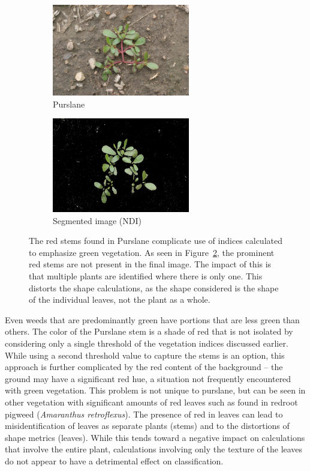 \documentclass[letterpaper]{report}
\begin{document}
\begin{figure}[h!]
	\centering
	\begin{subfigure}[h]{.40\textwidth}
		\centering
		\includegraphics[width=6cm]{./figures/purslane.png}
		\caption{Purslane}
		\label{fig:purslane}
	\end{subfigure}
	\begin{subfigure}[h]{.40\textwidth}
		\centering
		\includegraphics[width=6cm]{./figures/purslane-segmented.jpg}
		\caption{Segmented image (NDI)}
		\label{fig:purslane-segmented}
	\end{subfigure}
	\caption[Color problems complicate segmentation]{The red stems found in Purslane complicate use of indices calculated to emphasize green vegetation. As seen in Figure~\ref{fig:purslane-segmented}, the prominent red stems are not present in the final image. The impact of this is that multiple plants are identified where there is only one. This distorts the shape calculations, as the shape considered is the shape of the individual leaves, not the plant as a whole.}
	\label{fig:segmentation-problem}
\end{figure}

Even weeds that are predominantly green have portions that are less green than others. The color of the Purslane stem is a shade of red that is not isolated by considering only a single threshold of the vegetation indices discussed earlier. While using a second threshold value to capture the stems is an option, this approach is further complicated by the red content of the background -- the ground may have a significant red hue, a situation not frequently encountered with green vegetation. This problem is not unique to purslane, but can be seen in other vegetation with significant amounts of red leaves such as found in redroot pigweed (\textit{Amaranthus retroflexus}).  The presence of red in leaves can lead to misidentification of leaves as separate plants (stems) and to the distortions of shape metrics (leaves). While this tends toward a negative impact on calculations that involve the entire plant, calculations involving only the texture of the leaves do not appear to have a detrimental effect on classification.
\end{document}
